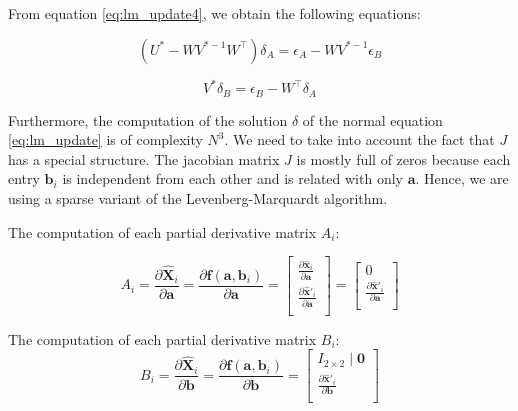 \documentclass[12pt]{article}
\begin{document}
From equation \ref{eq:lm_update4}, we obtain the following equations:

\begin{equation}
  (U^\ast - WV^{\ast -1}W^\top)\delta_A = \epsilon_A - WV^{\ast -1}\epsilon_B
\end{equation} 

\begin{equation}
  V^\ast\delta_B = \epsilon_B - W^\top\delta_A
\end{equation} 


Furthermore, the computation of the solution $\delta$ of the normal equation \ref{eq:lm_update} is of complexity $N^3$. We need to take into account the fact that $J$ has a special structure. The jacobian matrix $J$ is mostly full of zeros because each entry $\mathbf{b}_i$ is independent from each other and is related with only $\mathbf{a}$. Hence, we are using a sparse variant of the Levenberg-Marquardt algorithm.

The computation of each partial derivative matrix $A_i$:

\[
A_i = \frac{\partial\widehat{\mathbf{X}}_i}{\partial\mathbf{a}} = \frac{\partial\mathbf{f}(\mathbf{a}, \mathbf{b}_i)}{\partial\mathbf{a}} = 
\left [ 
  \begin{matrix}
    \frac{\partial \widehat{\mathbf{x}}_i}{\partial\mathbf{a}} \\
    \frac{\partial \widehat{\mathbf{x}}'_i}{\partial\mathbf{a}} \\
  \end{matrix}
\right ]
= 
\left [ 
  \begin{matrix}
    0 \\
    \frac{\partial \widehat{\mathbf{x}}'_i}{\partial\mathbf{a}} \\
  \end{matrix}
\right ]
\]

The computation of each partial derivative matrix $B_i$:
\[
B_i = \frac{\partial\widehat{\mathbf{X}}_i}{\partial\mathbf{b}} = \frac{\partial\mathbf{f}(\mathbf{a}, \mathbf{b}_i)}{\partial\mathbf{b}} =
 \left [ 
  \begin{matrix}
    I_{2\times 2} \mid \mathbf{0} \\
    \frac{\partial \widehat{\mathbf{x}}'_i}{\partial\mathbf{b}} \\
  \end{matrix}
\right ]
\]
\end{document}
